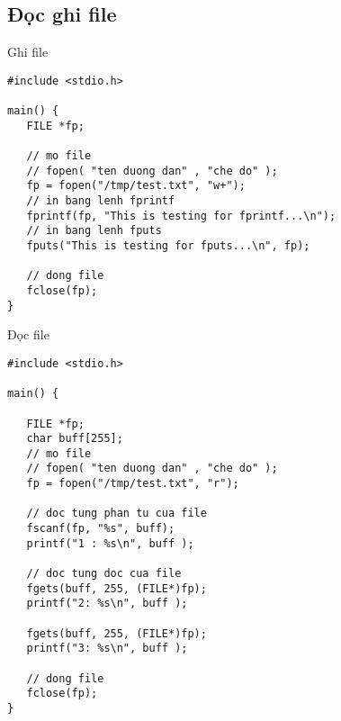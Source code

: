 \documentclass[12pt,a4paper]{article}
\begin{document}
\subsection{Đọc ghi file}
Ghi file
\begin{lstlisting}
#include <stdio.h>

main() {
   FILE *fp;

   // mo file
   // fopen( "ten duong dan" , "che do" );
   fp = fopen("/tmp/test.txt", "w+");
   // in bang lenh fprintf
   fprintf(fp, "This is testing for fprintf...\n");
   // in bang lenh fputs
   fputs("This is testing for fputs...\n", fp);
   
   // dong file
   fclose(fp);
}
\end{lstlisting}
Đọc file
\begin{lstlisting}
#include <stdio.h>

main() {

   FILE *fp;
   char buff[255];
   // mo file
   // fopen( "ten duong dan" , "che do" );
   fp = fopen("/tmp/test.txt", "r");
   
   // doc tung phan tu cua file
   fscanf(fp, "%s", buff);
   printf("1 : %s\n", buff );

   // doc tung doc cua file
   fgets(buff, 255, (FILE*)fp);
   printf("2: %s\n", buff );
   
   fgets(buff, 255, (FILE*)fp);
   printf("3: %s\n", buff );
   
   // dong file
   fclose(fp);
}
\end{lstlisting}
\end{document}
